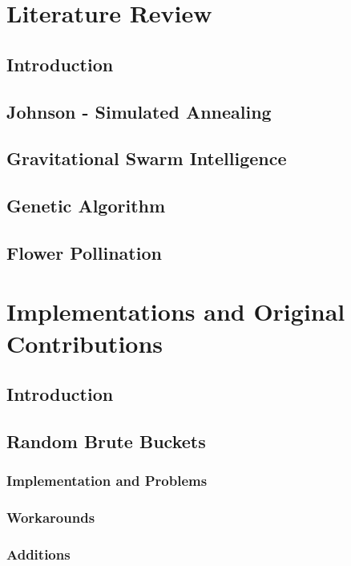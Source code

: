 \documentclass[11pt,a4paper]{report}
\begin{document}

\chapter{Literature Review}

\section{Introduction}

\section{Johnson - Simulated Annealing}

\section{Gravitational Swarm Intelligence}

\section{Genetic Algorithm}

\section{Flower Pollination}


\chapter{Implementations and Original Contributions}

\section{Introduction}

\section{Random Brute Buckets}
\subsection{Implementation and Problems}
\subsection{Workarounds}
\subsection{Additions}
\end{document}
